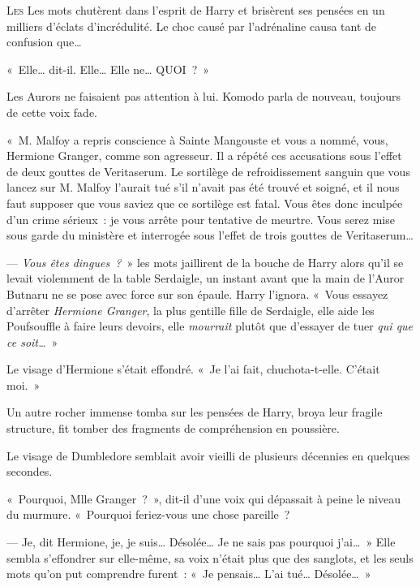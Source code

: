 
\lettrine{L}{es} Les mots chutèrent dans l'esprit de Harry et brisèrent ses pensées en un milliers d'éclats d'incrédulité. Le choc causé par l'adrénaline causa tant de confusion que…

«~Elle… dit-il. Elle… Elle ne… QUOI~?~»

Les Aurors ne faisaient pas attention à lui. Komodo parla de nouveau, toujours de cette voix fade.

«~M. Malfoy a repris conscience à Sainte Mangouste et vous a nommé, vous, Hermione Granger, comme son agresseur. Il a répété ces accusations sous l'effet de deux gouttes de Veritaserum. Le sortilège de refroidissement sanguin que vous lancez sur M. Malfoy l'aurait tué s'il n'avait pas été trouvé et soigné, et il nous faut supposer que vous saviez que ce sortilège est fatal. Vous êtes donc inculpée d'un crime sérieux~: je vous arrête pour tentative de meurtre. Vous serez mise sous garde du ministère et interrogée sous l'effet de trois gouttes de Veritaserum…

--- \emph{Vous êtes dingues~?}~» les mots jaillirent de la bouche de Harry alors qu'il se levait violemment de la table Serdaigle, un instant avant que la main de l'Auror Butnaru ne se pose avec force sur son épaule. Harry l'ignora. «~Vous essayez d'arrêter \emph{Hermione Granger}, la plus gentille fille de Serdaigle, elle aide les Poufsouffle à faire leurs devoirs, elle \emph{mourrait} plutôt que d'essayer de tuer \emph{qui que ce soit…}~»

Le visage d'Hermione s'était effondré. «~Je l'ai fait, chuchota-t-elle. C'était moi.~»

Un autre rocher immense tomba sur les pensées de Harry, broya leur fragile structure, fit tomber des fragments de compréhension en poussière.

Le visage de Dumbledore semblait avoir vieilli de plusieurs décennies en quelques secondes.

«~Pourquoi, Mlle Granger~?~», dit-il d'une voix qui dépassait à peine le niveau du murmure. «~Pourquoi feriez-vous une chose pareille~?

--- Je, dit Hermione, je, je suis… Désolée… Je ne sais pas pourquoi j'ai…~» Elle sembla s'effondrer sur elle-même, sa voix n'était plus que des sanglots, et les seuls mots qu'on put comprendre furent~: «~Je pensais… L'ai tué… Désolée…~»

